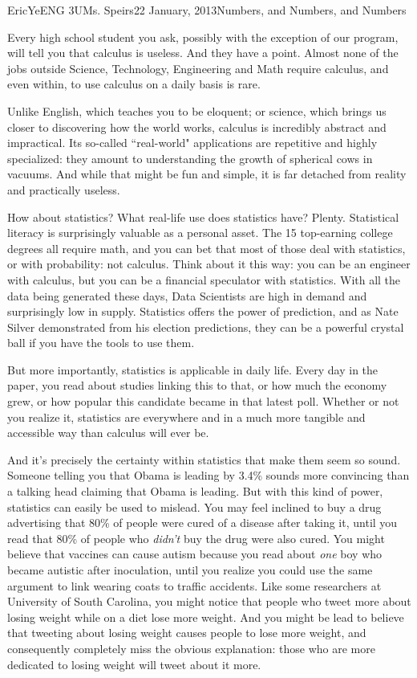 \documentclass[letterpaper,12pt]{article}
\begin{document}
\begin{mla}{Eric}{Ye}{ENG 3U}{Ms. Speirs}{22 January, 2013}{Numbers, and Numbers, and Numbers}

Every high school student you ask, possibly with the exception of our program, will tell you that calculus is useless. And they have a point. Almost none of the jobs outside Science, Technology, Engineering and Math require calculus, and even within, to use calculus on a daily basis is rare.

Unlike English, which teaches you to be eloquent; or science, which brings us closer to discovering how the world works, calculus is incredibly abstract and impractical. Its so-called ``real-world" applications are repetitive and highly specialized: they amount to understanding the growth of spherical cows in vacuums. And while that might be fun and simple, it is far detached from reality and practically useless.

How about statistics? What real-life use does statistics have?
Plenty. Statistical literacy is surprisingly valuable as a personal asset. The 15 top-earning college degrees all require math, and you can bet that most of those deal with statistics, or with probability: not calculus. Think about it this way: you can be an engineer with calculus, but you can be a financial speculator with statistics. With all the data being generated these days, Data Scientists are high in demand and surprisingly low in supply. Statistics offers the power of prediction, and as Nate Silver demonstrated from his election predictions, they can be a powerful crystal ball if you have the tools to use them.

But more importantly, statistics is applicable in daily life. Every day in the paper, you read about studies linking this to that, or how much the economy grew, or how popular this candidate became in that latest poll. Whether or not you realize it, statistics are everywhere and in a much more tangible and accessible way than calculus will ever be.

And it's precisely the certainty within statistics that make them seem so sound. Someone telling you that Obama is leading by 3.4\% sounds more convincing than a talking head claiming that Obama is leading. But with this kind of power, statistics can easily be used to mislead.
You may feel inclined to buy a drug advertising that 80\% of people were cured of a disease after taking it, until you read that 80\% of people who \emph{didn't} buy the drug were also cured. You might believe that vaccines can cause autism because you read about \emph{one} boy who became autistic after inoculation, until you realize you could use the same argument to link wearing coats to traffic accidents.
Like some researchers at University of South Carolina, you might notice that people who tweet more about losing weight while on a diet lose more weight. And you might be lead to believe that tweeting about losing weight causes people to lose more weight, and consequently completely miss the obvious explanation: those who are more dedicated to losing weight will tweet about it more.


\end{mla}
\end{document}
